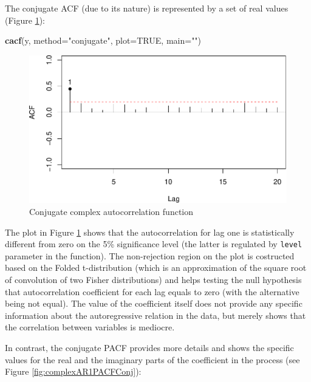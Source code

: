 \documentclass[
]{book}
\newenvironment{Shaded}{\begin{snugshade}}{\end{snugshade}}
\newcommand{\DataTypeTok}[1]{\textcolor[rgb]{0.13,0.29,0.53}{#1}}
\newcommand{\KeywordTok}[1]{\textcolor[rgb]{0.13,0.29,0.53}{\textbf{#1}}}
\newcommand{\NormalTok}[1]{#1}
\newcommand{\OtherTok}[1]{\textcolor[rgb]{0.56,0.35,0.01}{#1}}
\newcommand{\StringTok}[1]{\textcolor[rgb]{0.31,0.60,0.02}{#1}}
\begin{document}
The conjugate ACF (due to its nature) is represented by a set of real values (Figure \ref{fig:complexAR1ACFConj}):

\begin{Shaded}
\begin{Highlighting}[]
\KeywordTok{cacf}\NormalTok{(y, }\DataTypeTok{method=}\StringTok{"conjugate"}\NormalTok{, }\DataTypeTok{plot=}\OtherTok{TRUE}\NormalTok{, }\DataTypeTok{main=}\StringTok{""}\NormalTok{)}
\end{Highlighting}
\end{Shaded}

\begin{figure}
\centering
\includegraphics{Svetunkov---Svetunkov---Complex-Valued-Econometrics_files/figure-latex/complexAR1ACFConj-1.pdf}
\caption{\label{fig:complexAR1ACFConj}Conjugate complex autocorrelation function}
\end{figure}

The plot in Figure \ref{fig:complexAR1ACFConj} shows that the autocorrelation for lag one is statistically different from zero on the 5\% significance level (the latter is regulated by \texttt{level} parameter in the function). The non-rejection region on the plot is costructed based on the Folded t-distribution (which is an approximation of the square root of convolution of two Fisher distributions) and helps testing the null hypothesis that autocorrelation coefficient for each lag equals to zero (with the alternative being not equal). The value of the coefficient itself does not provide any specific information about the autoregressive relation in the data, but merely shows that the correlation between variables is mediocre.

In contrast, the conjugate PACF provides more details and shows the specific values for the real and the imaginary parts of the coefficient in the process (see Figure \ref{fig:complexAR1PACFConj}):
\end{document}
